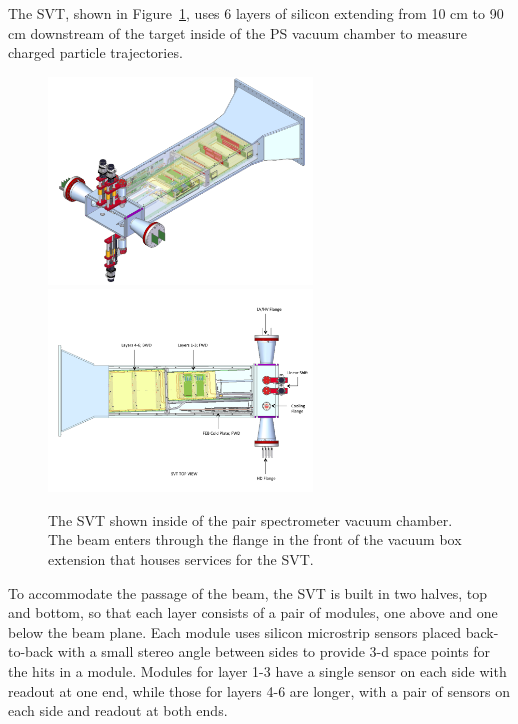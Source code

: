\documentclass[12pt]{report}
\begin{document}
The SVT, shown in Figure~\ref{fig:SVT}, uses 6 layers of silicon extending from 10 cm to 90 cm downstream of the target inside of the PS vacuum chamber to measure charged particle trajectories.  
\begin{figure}[htbp]
\begin{center}
    \includegraphics[width=7cm]{SVT}\includegraphics[width=7cm]{SVT_top}
\caption{The SVT shown inside of the pair spectrometer vacuum chamber.  The beam enters through the flange in the front of the vacuum box extension that houses services for the SVT. }
\label{fig:SVT}
\end{center}
\vspace*{-5mm}
\end{figure}
To accommodate the passage of the beam, the SVT is built in two halves, top and bottom, so that each layer consists of a pair of modules, one above and one below the beam plane.  Each module uses silicon microstrip sensors placed back-to-back with a small stereo angle between sides to provide 3-d space points for the hits in a module.  Modules for layer 1-3 have a single sensor on each side with readout at one end, while those for layers 4-6 are longer, with a pair of sensors on each side and readout at both ends.
\end{document}
